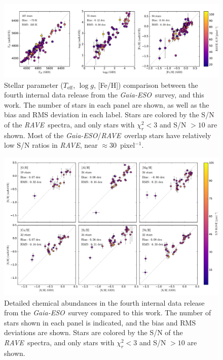 \documentclass[preprint,trackchanges]{aastex}
\newcommand{\acronym}[1]{{\small{#1}}}
\newcommand{\project}[1]{\textsl{#1}}
\newcommand{\rave}{\project{\acronym{RAVE}}}
\newcommand{\ges}{\project{Gaia-ESO}}
\newcommand{\teff}{T_{\mathrm{eff}}}
\newcommand{\logg}{\log g}
\begin{document}
\begin{figure}[p]
\includegraphics[width=\textwidth]{figures/ges-comparison.pdf}
\caption{Stellar parameter ($\teff$, $\logg$, [Fe/H]) comparison between the fourth internal data release from the \ges\ survey, and this work. The number of stars in each panel are shown, as well as the bias and RMS deviation in each label. Stars are colored by the S/N of the \rave\ spectra, and only stars with $\chi_r^2 < 3$ and S/N $> 10$ are shown.  Most of the \ges/\rave\ overlap stars have relatively low S/N ratios in \rave, near $\approx 30$~pixel$^{-1}$.\label{fig:ges-stellar-parameters}}
\end{figure}


\begin{figure}[p]
\includegraphics[width=\textwidth]{figures/ges-abundances.pdf}
\caption{Detailed chemical abundances in the fourth internal data release from the \ges\ survey compared to this work.  The number of stars shown in each panel is indicated, and the bias and RMS deviations are shown. Stars are colored by the S/N of the \rave\ spectra, and only stars with $\chi_r^2 < 3$ and S/N $> 10$ are shown.\label{fig:ges-abundances}}
\end{figure}
\end{document}
